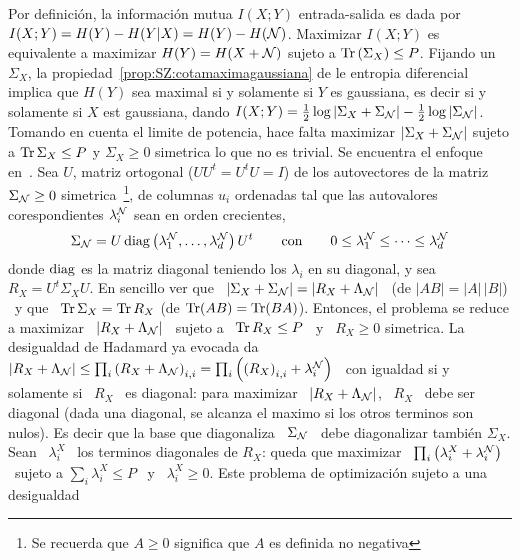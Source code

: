 Por  definici\'on, la informaci\'on  mutua $I(X;Y)$  entrada-salida es  dada por
$I(X;Y) = H(Y) - H(Y|X) = H(Y) - H(\mathcal{N})$. Maximizar $I(X;Y)$ es equivalente a
maximizar  $H(Y) =  H(X  + \mathcal{N})$  sujeto  a $\operatorname{Tr}\left(  \Sigma_X \right)  \le
P$. Fijando un  $\Sigma_X$, la propiedad~\ref{prop:SZ:cotamaximagaussiana} de le
entropia diferencial  implica que $H(Y)$  sea maximal si  y solamente si  $Y$ es
gaussiana, es decir si y solamente si $X$ est gaussiana, dando $I(X;Y) = \frac12
\log \left| \Sigma_X + \Sigma_{\mathcal{N}} \right| - \frac12 \log \left| \Sigma_{\mathcal{N}}
\right|$. Tomando en cuenta el  limite de potencia, hace falta maximizar $\left|
  \Sigma_X +  \Sigma_{\mathcal{N}} \right|$ sujeto a  $\operatorname{Tr} \Sigma_X \le  P$ y $\Sigma_X
\ge   0$  simetrica   lo  que   no  es   trivial.   Se   encuentra   el  enfoque
en~\cite[Sec.~9.4]{CovTho06}.  Sea $U$,  matriz ortogonal ($U U^t =  U^t U = I$)
de los  autovectores de la  matriz $\Sigma_{\mathcal{N}} \ge  0$ simetrica~\footnote{Se
  recuerda que $A \ge 0$ significa que $A$ es definida no negativa}, de columnas
$u_i$ ordenadas tal que  las autovalores corespondientes $\lambda^{\mathcal{N}}_i$ sean
en orden crecientes,\ie
%
\[
\Sigma_{\mathcal{N}}  =  U \operatorname{diag}\left(  \lambda^{\mathcal{N}}_1  ,  \ldots ,  \lambda^{\mathcal{N}}_d
\right)  U^t \qquad  \mbox{con} \qquad  0  \le \lambda^{\mathcal{N}}_1  \le \cdots  \le
\lambda^{\mathcal{N}}_d
\]
%
donde $\operatorname{diag}$ es  la matriz diagonal teniendo los $\lambda_i$  en su diagonal, y
sea  \ $R_X  =  U^t \Sigma_X  U$.   En sencillo  ver que  \  $\left| \Sigma_X  +
  \Sigma_{\mathcal{N}} \right|  = \left| R_X +  \Lambda_{\mathcal{N}} \right|$ \ (de  $|A B| =
|A| \,  |B|$) \ y  que \ $\operatorname{Tr} \Sigma_X  = \operatorname{Tr} R_X$  (de $\operatorname{Tr}(A B) =  \operatorname{Tr}(B A)$).
Entonces,  el problema  se reduce  a maximizar  \ $\left|  R_X  + \Lambda_{\mathcal{N}}
\right|$  \ sujeto  a  \ $\operatorname{Tr}  R_X \le  P$  \ y  \  $R_X \ge  0$ simetrica.   La
desigualdad de Hadamard ya evocada da \ $\left| R_X + \Lambda_{\mathcal{N}} \right| \le
\prod_i \left(  R_X + \Lambda_{\mathcal{N}}  \right)_{i,i} = \prod_i \left(  \left( R_X
  \right)_{i,i} + \lambda^{\mathcal{N}}_i  \right)$ \ con igualdad si  y solamente si \
$R_X$ \ es  diagonal: para maximizar \ $\left| R_X  + \Lambda_{\mathcal{N}} \right|$, \
$R_X$ \ debe ser diagonal (dada una  diagonal, se alcanza el maximo si los otros
terminos son nulos).   Es decir que la base que  diagonaliza \ $\Sigma_{\mathcal{N}}$ \
debe  diagonalizar tambi\'en $\Sigma_X$.   Sean \  $\lambda^X_i$ \  los terminos
diagonales  de  $R_X$: queda  que  maximizar  \  $\prod_i \left(  \lambda^X_i  +
  \lambda^{\mathcal{N}}_i  \right)$  \  sujeto a  $\sum_i  \lambda^X_i  \le  P$ \  y  \
$\lambda^X_i \ge 0$.   Este problema de optimizaci\'on sujeto  a una desigualdad
